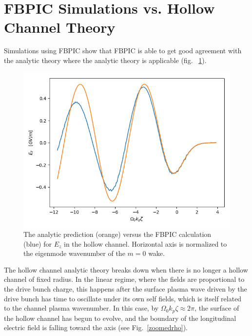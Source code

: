 \documentclass[]{tufte-handout}
\begin{document}
\section{FBPIC Simulations vs. Hollow Channel Theory}

Simulations using FBPIC show that FBPIC is able to get good agreement with the analytic theory where the analytic theory is applicable (fig. ~\ref{wakefields}).

\begin{figure}
\centering
\includegraphics[width=0.7\columnwidth]{figures/analytic_vs_fbpic.png}
\caption{\protect \label{wakefields} The analytic prediction (orange) versus the FBPIC calculation (blue) for $E_z$ in the hollow channel. Horizontal axis is normalized to the eigenmode wavenumber of the $m = 0$ wake.}
\end{figure}

The hollow channel analytic theory breaks down when there is no longer a hollow channel of fixed radius. In the linear regime, where the fields are proportional to the drive bunch charge, this happens after the surface plasma wave driven by the drive bunch has time to oscillate under its own self fields, which is itself related to the channel plasma wavenumber. In this case, by $\Omega_0 k_p \zeta \approx 2 \pi$, the surface of the hollow channel has begun to evolve, and the boundary of the longitudinal electric field is falling toward the axis (see Fig.~\ref{zoomedrho}).
\end{document}
